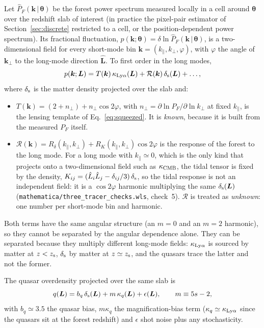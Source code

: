 \documentclass[11pt,a4paper]{article}
\newcommand{\vL}{\bm{L}}
\newcommand{\vth}{\bm{\theta}}
\newcommand{\kpar}{k_\parallel}
\newcommand{\kcmb}{\kappa_{\rm CMB}}
\newcommand{\klya}{\kappa_{{\rm Ly}\alpha}}
\begin{document}
Let $\hat P_F(\bm k\,|\,\vth)$ be the forest power spectrum measured locally in a cell around $\vth$ over the redshift slab of interest (in practice the pixel-pair estimator of Section~\ref{sec:discrete} restricted to a cell, or the position-dependent power spectrum). Its fractional fluctuation, $p(\bm k;\vth)=\delta\ln\hat P_F(\bm k\,|\,\vth)$, is a two-dimensional field for every short-mode bin $\bm k=(\kpar,k_\perp,\varphi)$, with $\varphi$ the angle of $\bm k_\perp$ to the long-mode direction $\hat{\vL}$. To first order in the long modes,
\begin{equation}
p(\bm k;\vL)=T(\bm k)\,\klya(\vL)+\mathcal R(\bm k)\,\delta_{\rm s}(\vL)+\ldots,
\label{eq:pmodel}
\end{equation}
where $\delta_{\rm s}$ is the matter density projected over the slab and:
\begin{itemize}
\item $T(\bm k)=(2+n_\perp)+n_\perp\cos2\varphi$, with $n_\perp=\partial\ln P_F/\partial\ln k_\perp$ at fixed $\kpar$, is the lensing template of Eq.~\eqref{eq:squeezed}. It is \emph{known}, because it is built from the measured $P_F$ itself.
\item $\mathcal R(\bm k)=R_\delta(\kpar,k_\perp)+R_K(\kpar,k_\perp)\cos2\varphi$ is the response of the forest to the long mode. For a long mode with $\kpar\simeq0$, which is the only kind that projects onto a two-dimensional field such as $\kcmb$, the tidal tensor is fixed by the density, $K_{ij}=(\hat L_i\hat L_j-\delta_{ij}/3)\,\delta_{\rm s}$, so the tidal response is not an independent field: it is a $\cos2\varphi$ harmonic multiplying the same $\delta_{\rm s}(\vL)$ (\texttt{mathematica/three\_tracer\_checks.wls}, check~5). $\mathcal R$ is treated as \emph{unknown}: one number per short-mode bin and harmonic.
\end{itemize}
Both terms have the same angular structure (an $m=0$ and an $m=2$ harmonic), so they cannot be separated by the angular dependence alone. They can be separated because they multiply different long-mode fields: $\klya$ is sourced by matter at $z<z_{\rm s}$, $\delta_{\rm s}$ by matter at $z\simeq z_{\rm s}$, and the quasars trace the latter and not the former.

The quasar overdensity projected over the same slab is
\begin{equation}
q(\vL)=b_q\,\delta_{\rm s}(\vL)+m\,\kappa_q(\vL)+\epsilon(\vL),\qquad m\equiv5s-2,
\label{eq:qmodel}
\end{equation}
with $b_q\simeq3.5$ the quasar bias, $m\kappa_q$ the magnification-bias term ($\kappa_q\simeq\klya$ since the quasars sit at the forest redshift) and $\epsilon$ shot noise plus any stochasticity.
\end{document}
